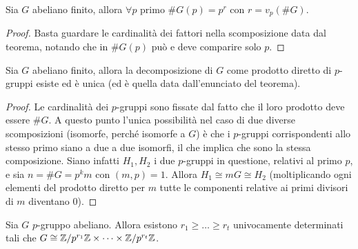 \begin{corollary}{1}
    Sia $G$ abeliano finito, allora $\forall p$ primo $\#G(p) = p^r$ con $r = v_p(\#G)$.
\end{corollary}
\begin{proof}
    Basta guardare le cardinalità dei fattori nella scomposizione data dal teorema, notando che in $\#G(p)$ può e deve comparire solo $p$.
\end{proof}
\begin{corollary}{2}
    Sia $G$ abeliano finito, allora la decomposizione di $G$ come prodotto diretto di $p$-gruppi esiste ed è unica (ed è quella data dall'enunciato del teorema). 
\end{corollary}
\begin{proof}
    Le cardinalità dei $p$-gruppi sono fissate dal fatto che il loro prodotto deve essere $\#G$. A questo punto l'unica possibilità nel caso di due diverse scomposizioni (isomorfe, perché isomorfe a $G$) è che i $p$-gruppi corrispondenti allo stesso primo siano a due a due isomorfi, il che implica che sono la stessa composizione. Siano infatti $H_1, H_2$ i due $p$-gruppi in questione, relativi al primo $p$, e sia $n = \#G = p^km$ con $(m,p)=1$. Allora $H_1 \cong mG \cong H_2$ (moltiplicando ogni elementi del prodotto diretto per $m$ tutte le componenti relative ai primi divisori di $m$ diventano 0).
\end{proof}
\begin{theorem}{2}
    Sia $G$ $p$-gruppo abeliano. Allora esistono $r_1 \geq \dots \geq r_t$ univocamente determinati tali che $G \cong \mathbb{Z}/p^{r_1}\mathbb{Z} \times \dots \times \mathbb{Z}/p^{r_t}\mathbb{Z}$.
\end{theorem}

